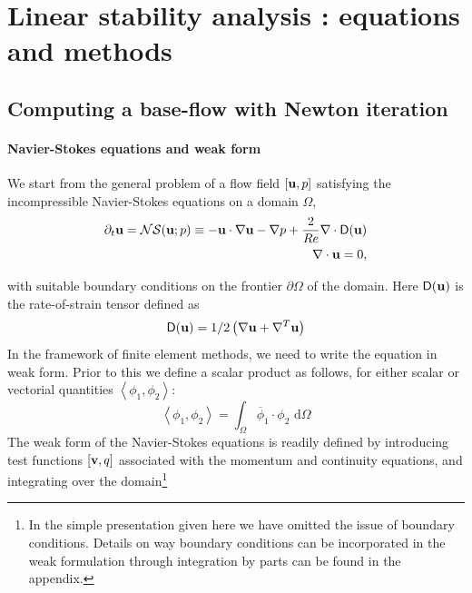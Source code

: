 \documentclass[twocolumn,10pt]{asme2ej}
\begin{document}

\section{Linear stability analysis : equations and methods}
\vspace{.2cm}

\subsection{Computing a base-flow with Newton iteration}
\vspace{.2cm}

\paragraph{Navier-Stokes equations and weak form}

We start from the general problem of a flow field $[{\bf u},p]$ satisfying the incompressible Navier-Stokes equations on a domain $\Omega$,
\begin{eqnarray} \label{NSprimitive}
\partial_t {\bf u} = {\cal NS} ({\bf u};p)
\equiv - {\bf u} \cdot \nabla {\bf u} - \nabla p + \frac{2}{Re}  \nabla \cdot {\mathsf{D}}({\bf u})  \\
\nabla \cdot {\bf u} = 0,
\end{eqnarray}

with suitable boundary conditions on the frontier $\partial \Omega$ of the domain.
Here $ {\mathsf{D}}({\bf u}) $ is the rate-of-strain tensor defined as
$$
 {\mathsf{D}}({\bf u}) = 1/2
\left( \nabla {\bf u} +  \nabla^T  {\bf u}\right)
$$ 
In the framework of finite element methods, we need to write the equation in weak form.
Prior to this we define a scalar product as follows, for either scalar or vectorial quantities 
$\left< \phi_1, \phi_2 \right> $:
$$
\left< \phi_1, \phi_2 \right> = \int_\Omega \overline{\phi}_1 \cdot \phi_2   \mbox{ d} \Omega
$$
The weak form of the Navier-Stokes equations is readily defined by introducing test functions 
$[{\bf v},q]$ associated with the momentum and continuity equations, and integrating over the domain\footnote{In the simple presentation given here we have omitted the issue of boundary conditions. Details on way boundary conditions can be incorporated in the weak formulation through integration by parts can be found in the appendix.}
\end{document}
